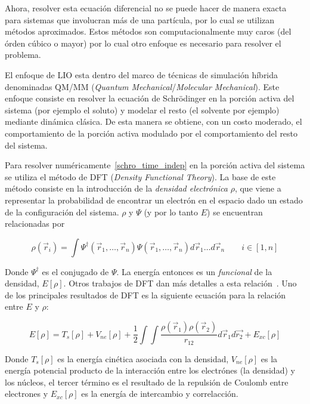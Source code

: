 Ahora, resolver esta ecuaci\'on diferencial no se puede hacer de manera exacta para sistemas que involucran m\'as
de una part\'icula, por lo cual se utilizan m\'etodos aproximados. Estos m\'etodos son computacionalmente muy caros
(del \'orden c\'ubico o mayor) por lo cual otro enfoque es necesario para resolver el problema.

El enfoque de LIO esta dentro del marco de t\'ecnicas de simulaci\'on h\'ibrida denominadas QM/MM 
(\textit{Quantum Mechanical}/\textit{Molecular Mechanical}). Este enfoque consiste en resolver la ecuaci\'on de
Schr\"odinger en la porci\'on activa del sistema (por ejemplo el soluto) y modelar el resto (el solvente por
ejemplo) mediante din\'amica cl\'asica. De esta manera se obtiene, con un costo moderado, el comportamiento de
la porci\'on activa modulado por el comportamiento del resto del sistema.

Para resolver num\'ericamente~\ref{schro_time_indep} en la porci\'on activa del sistema se utiliza el m\'etodo
de DFT (\textit{Density Functional Theory}). La base de este m\'etodo consiste en la introducci\'on de la
\textit{densidad electr\'onica} $\rho$, que viene a representar la probabilidad de encontrar un electr\'on en
el espacio dado un estado de la configuraci\'on del sistema. $\rho$ y $\Psi$ (y por lo tanto $E$) se encuentran relacionadas por

\begin{equation}
    \label{honenberg_kohn}
    \rho(\vec{r}_i) = \int \Psi^{\dagger}(\vec{r}_1, \dots, \vec{r}_n) \Psi(\vec{r}_1, \dots, \vec{r}_n) d\vec{r}_1 \dots d\vec{r}_n \qquad i \in [1,n]
\end{equation}

Donde $\Psi^{\dagger}$ es el conjugado de $\Psi$. La energ\'ia entonces es un \textit{funcional} de la densidad, $E[\rho]$. Otros trabajos de DFT dan m\'as
detalles a esta relaci\'on~\cite{HohenbergKohn}. Uno de los principales resultados de DFT es la siguiente ecuaci\'on para la relaci\'on entre $E$ y $\rho$:

\begin{equation}
    \label{honenberg_kohn} 
    E[\rho] = T_s[\rho] + V_{ne}[\rho] + \frac{1}{2} \int \int \frac{\rho(\vec{r}_1) \rho(\vec{r}_2)}{r_{12}} d\vec{r}_1 d\vec{r_2} + E_{xc}[\rho]
\end{equation}

Donde $T_s[\rho]$ es la energ\'ia cin\'etica asociada con la densidad, $V_{ne}[\rho]$ es la energ\'ia potencial producto de la interacci\'on entre los
electr\'ones (la densidad) y los n\'ucleos, el tercer t\'ermino es el resultado de la repulsi\'on de Coulomb entre electrones y $E_{xc}[\rho]$ es la
energ\'ia de intercambio y correlacci\'on.

